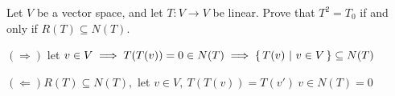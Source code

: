 Let $V$ be a vector space, and let $T:V \rightarrow V$ be linear. Prove that $T^2 = T_0$ if and only if $R(T) \subseteq N(T)$.

\begin{tcolorbox}
	$(\Rightarrow)$ let $v \in V \implies T(T(v)) = 0 \in N(T) \implies \left\{ \,T(v)~|~v \in V \,\right\} \subseteq N(T)$
	
	$(\Leftarrow) R(T) \subseteq N(T),$ let $v \in V, ~T(T(v))=T(v')~v\in N(T) = 0$
\end{tcolorbox}